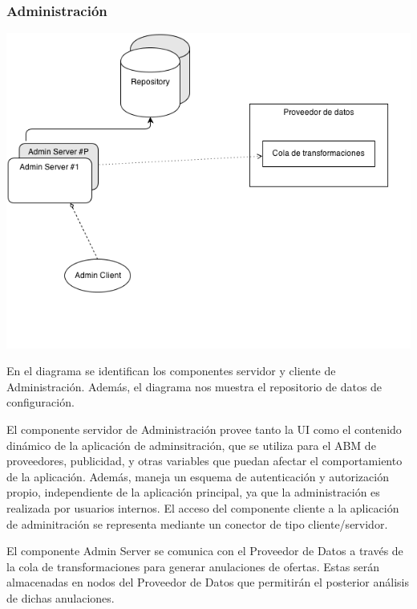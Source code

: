

\subsubsection*{Administraci\'on}

\includegraphics[scale=0.5]{ISW2_cNc_Administracion}

En el diagrama se identifican los componentes servidor y cliente de Administraci\'on. Adem\'as, el diagrama nos muestra el repositorio de datos de configuraci\'on.

El componente servidor de Administraci\'on provee tanto la UI como el contenido din\'amico de la aplicaci\'on de adminsitraci\'on, que se utiliza para el ABM de proveedores, publicidad, y otras variables que puedan afectar el comportamiento de la aplicaci\'on. Adem\'as, maneja un esquema de autenticaci\'on y autorizaci\'on propio, independiente de la aplicaci\'on principal, ya que la administraci\'on es realizada por usuarios internos. El acceso del componente cliente a la aplicaci\'on de adminitraci\'on se representa mediante un conector de tipo cliente/servidor.

El componente Admin Server se comunica con el Proveedor de Datos a trav\'es de la cola de transformaciones para generar anulaciones de ofertas. Estas ser\'an almacenadas en nodos del Proveedor de Datos que permitir\'an el posterior an\'alisis de dichas anulaciones.


